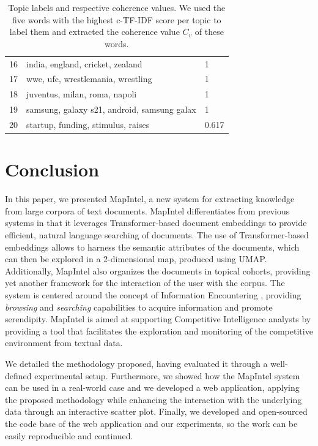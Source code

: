 \documentclass[a4paper]{article}
\begin{document}
\begin{table}[H]
{\begin{tabular}{@{}Sll@{}}
			16                    & india, england, cricket, zealand             & 1                        \\
			17                    & wwe, ufc, wrestlemania, wrestling            & 1                        \\
			18                    & juventus, milan, roma, napoli                & 1                        \\
			19                    & samsung, galaxy s21, android, samsung galax  & 1                        \\
			20                    & startup, funding, stimulus, raises           & 0.617                    \\  \bottomrule
		\end{tabular}%
	}
	\caption{Topic labels and respective coherence values. We used the five words with the highest c-TF-IDF score per topic to label them and extracted the coherence value $C_v$ of these words.}
	\label{topic_labels}
\end{table}

\section{Conclusion}
In this paper, we presented MapIntel, a new system for extracting knowledge from large corpora of text documents. MapIntel differentiates from previous systems in that it leverages Transformer-based document embeddings to provide efficient, natural language searching of documents. The use of Transformer-based embeddings allows to harness the semantic attributes of the documents, which can then be explored in a 2-dimensional map, produced using UMAP. Additionally, MapIntel also organizes the documents in topical cohorts, providing yet another framework for the interaction of the user with the corpus. The system is centered around the concept of Information Encountering \citep{erdelez2020}, providing \emph{browsing} and \emph{searching} capabilities to acquire information and promote serendipity. MapIntel is aimed at supporting Competitive Intelligence analysts by providing a tool that facilitates the exploration and monitoring of the competitive environment from textual data.

We detailed the methodology proposed, having evaluated it through a well-defined experimental setup. Furthermore, we showed how the MapIntel system can be used in a real-world case and we developed a web application, applying the proposed methodology while enhancing the interaction with the underlying data through an interactive scatter plot. Finally, we developed and open-sourced the code base of the web application and our experiments, so the work can be easily reproducible and continued.
\end{document}
